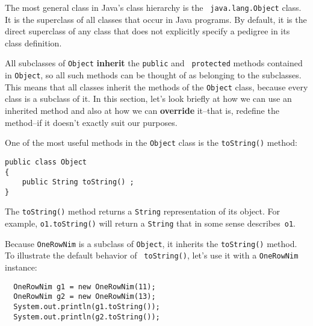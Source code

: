 The most general class in Java's class hierarchy is the {\tt
java.lang.Object} class.  It is the superclass of all classes that
occur in Java programs.  By default, it is the direct superclass of
any class that does not explicitly specify a pedigree in its class
definition.

All subclasses of {\tt Object} {\bf inherit} the {\tt public} and {\tt
protected} methods contained in {\tt Object},
so all such methods can be thought of as belonging to the subclasses.
This means that all classes inherit the methods of the {\tt Object}
class, because every class is a subclass of it.  In this section,
let's look briefly at how we can use an inherited method and
also at how we can {\bf override} it--that is, redefine the method--if
it doesn't exactly suit our purposes.

One of the most useful methods in the {\tt Object} class is the
{\tt toString()} method:

\begin{jjjlisting}
\begin{lstlisting}
public class Object
{   
    public String toString() ;
}
\end{lstlisting}
\end{jjjlisting}

\noindent The {\tt toString()} method
returns a {\tt String} representation of its object. For
example, {\tt o1.toString()} will return a {\tt String} that in some
sense describes~{\tt o1}.

Because {\tt OneRowNim} is a subclass of {\tt Object}, it inherits the
{\tt toString()} method.  To illustrate the default behavior of {\tt
toString()}, let's use it with a {\tt OneRowNim} instance:

\begin{jjjlisting}
\begin{lstlisting}
  OneRowNim g1 = new OneRowNim(11);
  OneRowNim g2 = new OneRowNim(13);
  System.out.println(g1.toString());
  System.out.println(g2.toString());
\end{lstlisting}
\end{jjjlisting}

